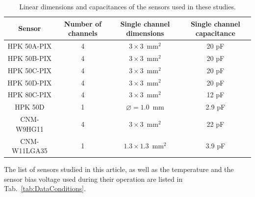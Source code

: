 \documentclass[preprint,1p]{elsarticle}
\begin{document}
\begin{table}[!htb]
\scriptsize
\begin{center}
  \begin{tabular}{ |c | c | c | c | }
    \hline
    Sensor      & Number of channels & Single channel dimensions &  Single channel capacitance  \\ \hline 
    HPK 50A-PIX & 4 & $3\times 3$~$\mathrm{mm}^{2}$ & 20 pF \\       
    HPK 50B-PIX & 4 & $3\times 3$~$\mathrm{mm}^{2}$ & 20 pF \\       
    HPK 50C-PIX & 4 & $3\times 3$~$\mathrm{mm}^{2}$ & 20 pF \\       
    HPK 50D-PIX & 4 & $3\times 3$~$\mathrm{mm}^{2}$ & 20 pF \\       
    HPK 80C-PIX & 4 & $3\times 3$~$\mathrm{mm}^{2}$ & 12 pF \\       
    HPK 50D     & 1 & $\diameter=1.0$~$\mathrm{mm}$  & 2.9 pF \\       
    CNM-W9HG11  & 4 & $3\times 3$~$\mathrm{mm}^{2}$ & 22 pF \\       
    CNM-W11LGA35& 1 & $1.3\times 1.3$~$\mathrm{mm}^{2}$ & 3.9 pF \\       
    \hline
  \end{tabular}
\caption{Linear dimensions and capacitances of the sensors used in these studies.}  
\label{tab:sensors}
\end{center}
\end{table}

The list of sensors studied in this article, as well as the temperature and the
sensor bias voltage used during their operation are listed in
Tab.~\ref{tab:DataConditions}. 
\end{document}
